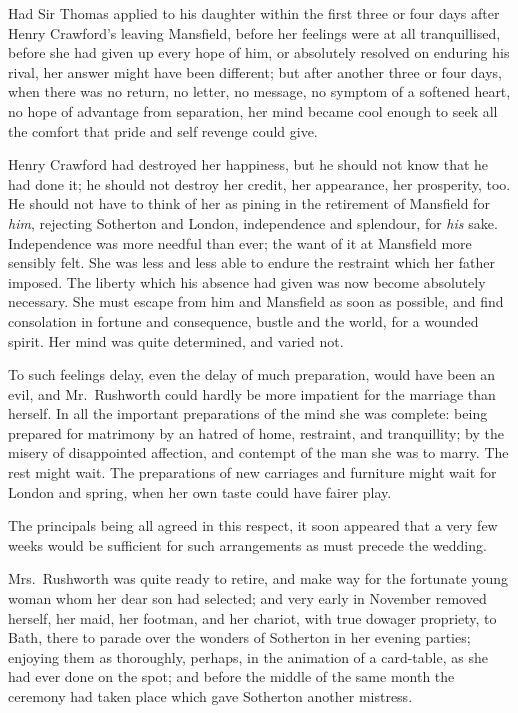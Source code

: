 \documentclass{article}
\begin{document}
Had Sir Thomas applied to his daughter within the first
three or four days after Henry Crawford's leaving Mansfield,
before her feelings were at all tranquillised, before she
had given up every hope of him, or absolutely resolved on
enduring his rival, her answer might have been different;
but after another three or four days, when there was no return,
no letter, no message, no symptom of a softened heart,
no hope of advantage from separation, her mind became
cool enough to seek all the comfort that pride and self
revenge could give.

Henry Crawford had destroyed her happiness, but he
should not know that he had done it; he should not
destroy her credit, her appearance, her prosperity, too.
He should not have to think of her as pining in the
retirement of Mansfield for \emph{him}, rejecting Sotherton
and London, independence and splendour, for \emph{his} sake.
Independence was more needful than ever; the want of it
at Mansfield more sensibly felt.  She was less and less
able to endure the restraint which her father imposed.
The liberty which his absence had given was now become
absolutely necessary.  She must escape from him and Mansfield
as soon as possible, and find consolation in fortune
and consequence, bustle and the world, for a wounded spirit.
Her mind was quite determined, and varied not.

To such feelings delay, even the delay of much preparation,
would have been an evil, and Mr.\ Rushworth could hardly
be more impatient for the marriage than herself.
In all the important preparations of the mind she
was complete:  being prepared for matrimony by an hatred
of home, restraint, and tranquillity; by the misery
of disappointed affection, and contempt of the man she
was to marry.  The rest might wait.  The preparations
of new carriages and furniture might wait for London
and spring, when her own taste could have fairer play.

The principals being all agreed in this respect, it soon
appeared that a very few weeks would be sufficient
for such arrangements as must precede the wedding.

Mrs.\ Rushworth was quite ready to retire, and make way for
the fortunate young woman whom her dear son had selected;
and very early in November removed herself, her maid,
her footman, and her chariot, with true dowager propriety,
to Bath, there to parade over the wonders of Sotherton
in her evening parties; enjoying them as thoroughly,
perhaps, in the animation of a card-table, as she had
ever done on the spot; and before the middle of the same
month the ceremony had taken place which gave Sotherton
another mistress.
\end{document}

